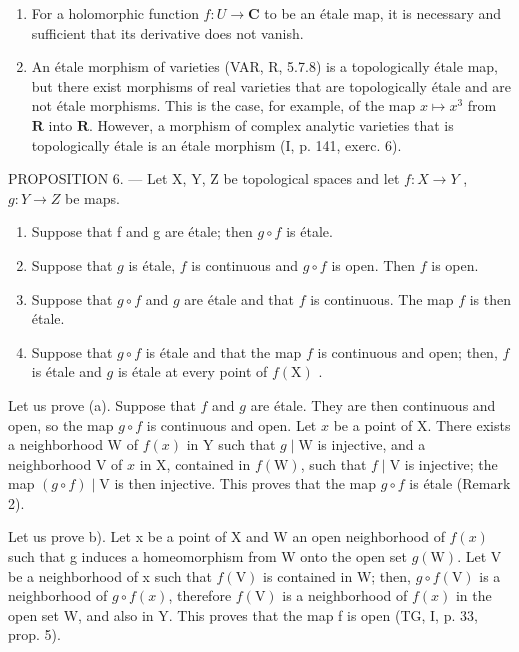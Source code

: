 \begin{enumerate}
\def\labelenumi{\arabic{enumi})}
\setcounter{enumi}{1}
\item
For a holomorphic function \(f\colon U \to \mathbf{C}\) to be an étale map, it is necessary and sufficient that its derivative does not vanish.
\item
  An étale morphism of varieties (VAR, R, 5.7.8) is a topologically étale map, but there exist morphisms of real varieties that are topologically étale and are not étale morphisms. This is the case, for example, of the map \(x \mapsto x^3\) from \(\mathbf{R}\) into \(\mathbf{R}\). However, a morphism of complex analytic varieties that is topologically étale is an étale morphism (I, p. 141, exerc. 6).
\end{enumerate}

PROPOSITION 6. — Let X, Y, Z be topological spaces and let \(f\colon X\to Y\) , \(g\colon Y\to Z\) be maps.

\begin{enumerate}
\def\labelenumi{\alph{enumi})}
\item
  Suppose that f and g are étale; then \(g \circ f\) is étale.
\item
  Suppose that \(g\) is étale, \(f\) is continuous and \(g \circ f\) is open. Then \(f\) is open.
\item
  Suppose that \(g \circ f\) and \(g\) are étale and that \(f\) is continuous. The map \(f\) is then étale.
\item
  Suppose that \(g \circ f\) is étale and that the map \(f\) is continuous and open; then, \(f\) is étale and \(g\) is étale at every point of \(f(\mathrm{X})\) .
\end{enumerate}

Let us prove (a). Suppose that \(f\) and \(g\) are étale. They are then continuous and open, so the map \(g \circ f\) is continuous and open. Let \(x\) be a point of X. There exists a neighborhood W of \(f(x)\) in Y such that \(g \mid \mathrm{W}\) is injective, and a neighborhood V of \(x\) in X, contained in \(f(\mathrm{W})\), such that \(f \mid \mathrm{V}\) is injective; the map \((g \circ f) \mid \mathrm{V}\) is then injective. This proves that the map \(g \circ f\) is étale (Remark 2).

Let us prove b). Let x be a point of X and W an open neighborhood of \(f(x)\) such that g induces a homeomorphism from W onto the open set \(g(\mathrm{W})\). Let V be a neighborhood of x such that \(f(\mathrm{V})\) is contained in W; then, \(g \circ f(\mathrm{V})\) is a neighborhood of \(g \circ f(x)\), therefore \(f(\mathrm{V})\) is a neighborhood of \(f(x)\) in the open set W, and also in Y. This proves that the map f is open (TG, I, p. 33, prop. 5).

